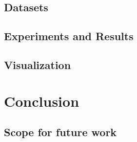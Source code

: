 \documentclass[a4paper, 12pt]{article}
\begin{document}
\subsection{Datasets}
\subsection{Experiments and Results}
\subsection{Visualization}
\newpage
\section{Conclusion}
\subsection{Scope for future work}
\nocite{fontaine,gao,poorzahedy2,tianze,leblanc,kuo,poorzahedy1,wen}



\end{document}
